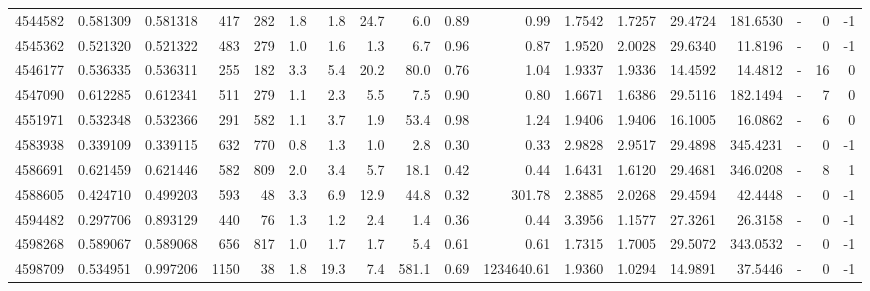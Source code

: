 \begin{tabular}{rrrrrrrrrrrrrrrlrr}
   4544582 & 0.581309 &   0.581318 &  417 &  282 &      1.8 &      1.8 &    24.7 &      6.0 &       0.89 &        0.99 &  1.7542 &  1.7257 &   29.4724 &  181.6530 &             - &        0 &         -1 \\
   4545362 & 0.521320 &   0.521322 &  483 &  279 &      1.0 &      1.6 &     1.3 &      6.7 &       0.96 &        0.87 &  1.9520 &  2.0028 &   29.6340 &   11.8196 &             - &        0 &         -1 \\
   4546177 & 0.536335 &   0.536311 &  255 &  182 &      3.3 &      5.4 &    20.2 &     80.0 &       0.76 &        1.04 &  1.9337 &  1.9336 &   14.4592 &   14.4812 &             - &       16 &          0 \\
   4547090 & 0.612285 &   0.612341 &  511 &  279 &      1.1 &      2.3 &     5.5 &      7.5 &       0.90 &        0.80 &  1.6671 &  1.6386 &   29.5116 &  182.1494 &             - &        7 &          0 \\
   4551971 & 0.532348 &   0.532366 &  291 &  582 &      1.1 &      3.7 &     1.9 &     53.4 &       0.98 &        1.24 &  1.9406 &  1.9406 &   16.1005 &   16.0862 &             - &        6 &          0 \\
   4583938 & 0.339109 &   0.339115 &  632 &  770 &      0.8 &      1.3 &     1.0 &      2.8 &       0.30 &        0.33 &  2.9828 &  2.9517 &   29.4898 &  345.4231 &             - &        0 &         -1 \\
   4586691 & 0.621459 &   0.621446 &  582 &  809 &      2.0 &      3.4 &     5.7 &     18.1 &       0.42 &        0.44 &  1.6431 &  1.6120 &   29.4681 &  346.0208 &             - &        8 &          1 \\
   4588605 & 0.424710 &   0.499203 &  593 &   48 &      3.3 &      6.9 &    12.9 &     44.8 &       0.32 &      301.78 &  2.3885 &  2.0268 &   29.4594 &   42.4448 &             - &        0 &         -1 \\
   4594482 & 0.297706 &   0.893129 &  440 &   76 &      1.3 &      1.2 &     2.4 &      1.4 &       0.36 &        0.44 &  3.3956 &  1.1577 &   27.3261 &   26.3158 &             - &        0 &         -1 \\
   4598268 & 0.589067 &   0.589068 &  656 &  817 &      1.0 &      1.7 &     1.7 &      5.4 &       0.61 &        0.61 &  1.7315 &  1.7005 &   29.5072 &  343.0532 &             - &        0 &         -1 \\
   4598709 & 0.534951 &   0.997206 & 1150 &   38 &      1.8 &     19.3 &     7.4 &    581.1 &       0.69 &  1234640.61 &  1.9360 &  1.0294 &   14.9891 &   37.5446 &             - &        0 &         -1 \\

\end{tabular}
